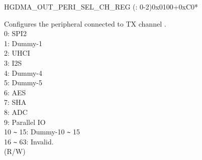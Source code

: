 \begin{register}{H}{GDMA\_OUT\_PERI\_SEL\_CH\_REG (: 0-2)}{0x0100+0xC0*}\label{regdesc:GDMAOUTPERISELCHNREG}
%
%
\regnewline%
\begin{regdesc}\begin{reglist}
\label{fielddesc:GDMAPERIOUTSELCHN}\item [GDMA\_PERI\_OUT\_SEL\_CH\regindex{n}] Configures the peripheral connected to TX channel .\\
0: SPI2\\
1: Dummy-1\\
2: UHCI\\
3: I2S\\
4: Dummy-4\\
5: Dummy-5\\
6: AES\\
7: SHA\\
8: ADC\\
9: Parallel IO\\
10 \verb+~+  15: Dummy-10  \verb+~+  15\\
16 \verb+~+ 63: Invalid.\\
(R/W)
\end{reglist}\end{regdesc}
\end{register}


